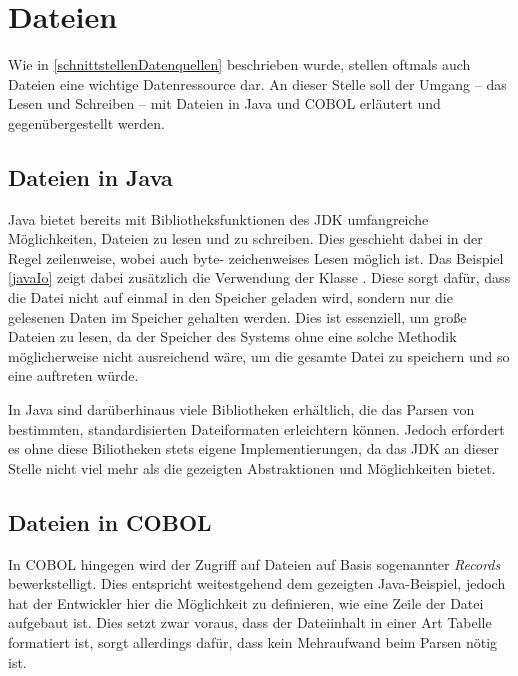 \section{Dateien}
Wie in \autoref{schnittstellenDatenquellen} beschrieben wurde, stellen oftmals auch Dateien eine wichtige Datenressource dar. An dieser Stelle soll der Umgang -- das Lesen und Schreiben -- mit Dateien in Java und COBOL erläutert und gegenübergestellt werden.

\subsection*{Dateien in Java}

Java bietet bereits mit Bibliotheksfunktionen des JDK umfangreiche Möglichkeiten, Dateien zu lesen und zu schreiben. Dies geschieht dabei in der Regel zeilenweise, wobei auch byte- \bzw zeichenweises Lesen möglich ist. Das Beispiel \autoref{javaIo} zeigt dabei zusätzlich die Verwendung der Klasse . Diese sorgt dafür, dass die Datei nicht auf einmal in den Speicher geladen wird, sondern nur die gelesenen Daten im Speicher gehalten werden. Dies ist essenziell, um große Dateien zu lesen, da der Speicher des Systems ohne eine solche Methodik möglicherweise nicht ausreichend wäre, um die gesamte Datei zu speichern und so eine  auftreten würde.


In Java sind darüberhinaus viele Bibliotheken erhältlich, die das Parsen von bestimmten, standardisierten Dateiformaten erleichtern können. Jedoch erfordert es ohne diese Biliotheken stets eigene Implementierungen, da das JDK an dieser Stelle nicht viel mehr als die gezeigten Abstraktionen und Möglichkeiten bietet.

\subsection*{Dateien in COBOL}\label{filesCobol}

In COBOL hingegen wird der Zugriff auf Dateien auf Basis sogenannter \textit{Records} bewerkstelligt. Dies entspricht weitestgehend dem gezeigten Java-Beispiel, jedoch hat der Entwickler hier die Möglichkeit zu definieren, wie eine Zeile der Datei aufgebaut ist. Dies setzt zwar voraus, dass der Dateiinhalt in einer Art Tabelle formatiert ist, sorgt allerdings dafür, dass kein Mehraufwand beim Parsen nötig ist. 

